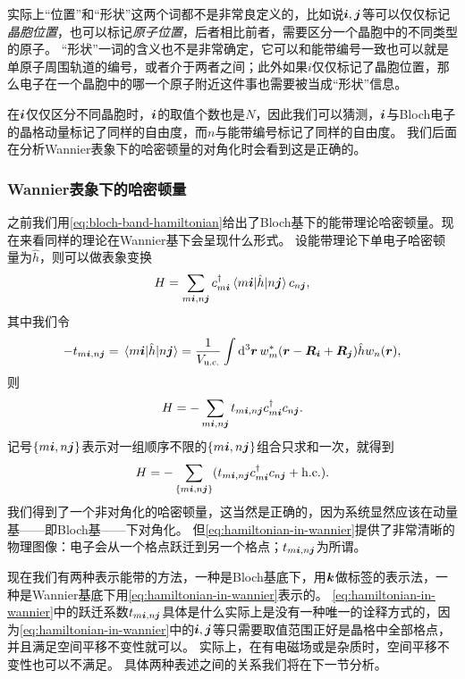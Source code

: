 实际上“位置”和“形状”这两个词都不是非常良定义的，比如说$\vb*{i}, \vb*{j}$等可以仅仅标记\emph{晶胞位置}，也可以标记\emph{原子位置}，后者相比前者，需要区分一个晶胞中的不同类型的原子。
“形状”一词的含义也不是非常确定，它可以和能带编号一致也可以就是单原子周围轨道的编号，或者介于两者之间；此外如果$i$仅仅标记了晶胞位置，那么电子在一个晶胞中的哪一个原子附近这件事也需要被当成“形状”信息。

在$\vb*{i}$仅仅区分不同晶胞时，$\vb*{i}$的取值个数也是$N$，因此我们可以猜测，$\vb*{i}$与Bloch电子的晶格动量标记了同样的自由度，而$n$与能带编号标记了同样的自由度。
我们后面在分析Wannier表象下的哈密顿量的对角化时会看到这是正确的。

\subsubsection{Wannier表象下的哈密顿量}

之前我们用\eqref{eq:bloch-band-hamiltonian}给出了Bloch基下的能带理论哈密顿量。现在来看同样的理论在Wannier基下会呈现什么形式。
设能带理论下单电子哈密顿量为$\hat{h}$，则可以做表象变换
\[
    {H} = \sum_{m\vb*{i}, n\vb*{j}} {c}^\dagger_{m\vb*{i}} \mel{m\vb*{i}}{\hat{h}}{n\vb*{j}} {c}_{n\vb*{j}},
\]
其中我们令
\begin{equation}
    - t_{m\vb*{i}, n\vb*{j}} = \mel{m\vb*{i}}{\hat{h}}{n\vb*{j}} = \frac{1}{V_\text{u.c.}} \int \dd[3]{\vb*{r}} w_m^*(\vb*{r} - \vb*{R}_{\vb*{i}} + \vb*{R}_{\vb*{j}}) \hat{h} w_n(\vb*{r}),
    \label{eq:wannier-hopping-term}
\end{equation}
则
\[
    {H} = - \sum_{m\vb*{i}, n\vb*{j}} t_{m\vb*{i}, n\vb*{j}} {c}^\dagger_{m\vb*{i}} {c}_{n\vb*{j}}.
\]
记号$\{m\vb*{i}, n\vb*{j}\}$表示对一组顺序不限的$\{m\vb*{i}, n\vb*{j}\}$组合只求和一次，就得到
\begin{equation}
    {H} = - \sum_{\{m\vb*{i}, n\vb*{j}\}} (t_{m\vb*{i}, n\vb*{j}} {c}_{m\vb*{i}}^\dagger {c}_{n\vb*{j}} + \text{h.c.}).
    \label{eq:hamiltonian-in-wannier}
\end{equation}
我们得到了一个非对角化的哈密顿量，这当然是正确的，因为系统显然应该在动量基——即Bloch基——下对角化。
但\eqref{eq:hamiltonian-in-wannier}提供了非常清晰的物理图像：电子会从一个格点跃迁到另一个格点；$t_{m\vb*{i}, n\vb*{j}}$为所谓。

现在我们有两种表示能带的方法，一种是Bloch基底下，用$\vb*{k}$做标签的表示法，一种是Wannier基底下用\eqref{eq:hamiltonian-in-wannier}表示的。
\eqref{eq:hamiltonian-in-wannier}中的跃迁系数$t_{m\vb*{i}, n\vb*{j}}$具体是什么实际上是没有一种唯一的诠释方式的，因为\eqref{eq:hamiltonian-in-wannier}中的$\vb*{i}, \vb*{j}$等只需要取值范围正好是晶格中全部格点，并且满足空间平移不变性就可以。
实际上，在有电磁场或是杂质时，空间平移不变性也可以不满足。
具体两种表述之间的关系我们将在下一节分析。

